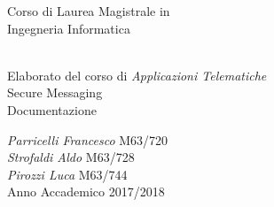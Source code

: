 
  \thispagestyle{empty}


  \begin{flushright}

    \begin{minipage}{0.6\textwidth}
      \begin{flushleft}
          \sffamily
          \vspace{2cm}
          \normalsize Corso di Laurea Magistrale in \\\Large Ingegneria Informatica \\
          \footnotesize \textcolor{black!60}{} \\[2cm]
          \begin{center}
          	
          \end{center}
          \large Elaborato del corso di \Large \textit{Applicazioni Telematiche}\\
          \HUGE Secure Messaging\\
          \large Documentazione
      \end{flushleft}
    \end{minipage}%

    \vfill
    \begin{minipage}{0.6\textwidth}
          \sffamily
          \small \textit{Parricelli Francesco} M63/720 \\
          \textit{Strofaldi Aldo} M63/728\\
          \textit{Pirozzi Luca} M63/744\\
          
          Anno Accademico 2017/2018\\
    \end{minipage}%
  \end{flushright}
